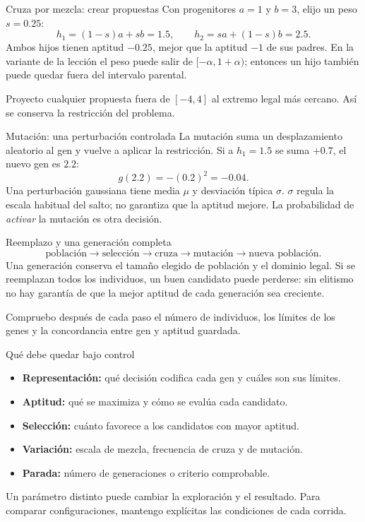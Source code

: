 \begin{frame}{Cruza por mezcla: crear propuestas}
Con progenitores $a=1$ y $b=3$, elijo un peso $s=0.25$:
\[
h_1=(1-s)a+sb=1.5,\qquad
h_2=sa+(1-s)b=2.5.
\]
Ambos hijos tienen aptitud $-0.25$, mejor que la aptitud $-1$ de sus padres.
En la variante de la lección el peso puede salir de $[-\alpha,1+\alpha)$;
entonces un hijo también puede quedar fuera del intervalo parental.
\medskip

Proyecto cualquier propuesta fuera de $[-4,4]$ al extremo legal más cercano.
Así se conserva la restricción del problema.
\end{frame}

\begin{frame}{Mutación: una perturbación controlada}
La mutación suma un desplazamiento aleatorio al gen y vuelve a aplicar la
restricción. Si a $h_1=1.5$ se suma $+0.7$, el nuevo gen es $2.2$:
\[
g(2.2)=-(0.2)^2=-0.04.
\]
Una perturbación gaussiana tiene media $\mu$ y desviación típica $\sigma$.
$\sigma$ regula la escala habitual del salto; no garantiza que la aptitud
mejore. La probabilidad de \emph{activar} la mutación es otra decisión.
\end{frame}

\begin{frame}{Reemplazo y una generación completa}
\[
\text{población}\longrightarrow\text{selección}
\longrightarrow\text{cruza}\longrightarrow\text{mutación}
\longrightarrow\text{nueva población}.
\]
Una generación conserva el tamaño elegido de población y el dominio legal.
Si se reemplazan todos los individuos, un buen candidato puede perderse:
sin elitismo no hay garantía de que la mejor aptitud de cada generación
sea creciente.
\medskip

Compruebo después de cada paso el número de individuos, los límites de los
genes y la concordancia entre gen y aptitud guardada.
\end{frame}

\begin{frame}{Qué debe quedar bajo control}
\begin{itemize}
\item \textbf{Representación:} qué decisión codifica cada gen y cuáles son sus límites.
\item \textbf{Aptitud:} qué se maximiza y cómo se evalúa cada candidato.
\item \textbf{Selección:} cuánto favorece a los candidatos con mayor aptitud.
\item \textbf{Variación:} escala de mezcla, frecuencia de cruza y de mutación.
\item \textbf{Parada:} número de generaciones o criterio comprobable.
\end{itemize}
Un parámetro distinto puede cambiar la exploración y el resultado. Para
comparar configuraciones, mantengo explícitas las condiciones de cada corrida.
\end{frame}

